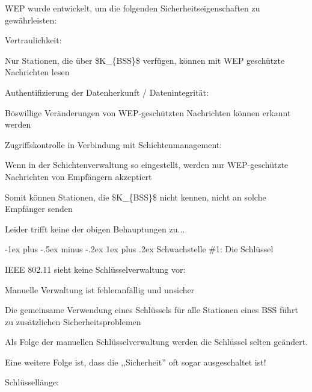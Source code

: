 \documentclass[a4paper]{article}
\makeatletter
\renewcommand{\subsubsection}{\@startsection{subsubsection}{3}{0mm}%
 {-1ex plus -.5ex minus -.2ex}%
 {1ex plus .2ex}%
 {\normalfont\small\bfseries}}
\makeatother
\begin{document}
\begin{multicols}{3}
      \begin{itemize*}
            \item
            WEP wurde entwickelt, um die folgenden Sicherheitseigenschaften zu
            gewährleisten:

            \begin{itemize*}
                  \item Vertraulichkeit:
                  \begin{itemize*} \item Nur Stationen, die über \$K\_\{BSS\}\$ verfügen, können mit WEP geschützte Nachrichten lesen \end{itemize*}
                  \item Authentifizierung der Datenherkunft / Datenintegrität:
                  \begin{itemize*} \item Böswillige Veränderungen von WEP-geschützten Nachrichten können erkannt werden \end{itemize*}
                  \item Zugriffskontrolle in Verbindung mit Schichtenmanagement:
                  \begin{itemize*} \item Wenn in der Schichtenverwaltung so eingestellt, werden nur WEP-geschützte Nachrichten von Empfängern akzeptiert \item Somit können Stationen, die \$K\_\{BSS\}\$ nicht kennen, nicht an solche Empfänger senden \end{itemize*}
            \end{itemize*}
            \item
            Leider trifft keine der obigen Behauptungen zu...
      \end{itemize*}


      \subsubsection{Schwachstelle \#1: Die
            Schlüssel}

      \begin{itemize*}
            \item
            IEEE 802.11 sieht keine Schlüsselverwaltung vor:

            \begin{itemize*}
                  \item Manuelle Verwaltung ist fehleranfällig und unsicher
                  \item Die gemeinsame Verwendung eines Schlüssels für alle Stationen eines BSS führt zu zusätzlichen Sicherheitsproblemen
                  \item Als Folge der manuellen Schlüsselverwaltung werden die Schlüssel selten geändert.
                  \item Eine weitere Folge ist, dass die ,,Sicherheit'' oft sogar ausgeschaltet ist!
            \end{itemize*}
            \item
            Schlüssellänge:


\end{itemize*}
\end{multicols}
\end{document}

